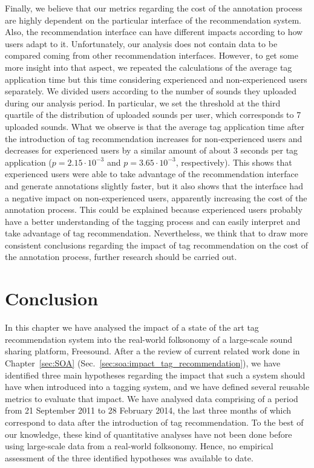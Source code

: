 Finally, we believe that our metrics regarding the cost of the annotation process are highly dependent on the particular interface of the recommendation system. Also, the recommendation interface can have different impacts according to how users adapt to it.
Unfortunately, our analysis does not contain data to be compared coming from other recommendation interfaces. 
However, to get some more insight into that aspect, we repeated the calculations of the average tag application time but this time considering experienced and non-experienced users separately. We divided users according to the number of sounds they uploaded during our analysis period. In particular, we set the threshold at the third quartile of the distribution of uploaded sounds per user, which corresponds to 7 uploaded sounds. What we observe is that the average tag application time after the introduction of tag recommendation increases for non-experienced users and decreases for experienced users by a similar amount of about 3 seconds per tag application ($p = 2.15\cdot 10^{-3}$ and $p = 3.65\cdot 10^{-3}$, respectively). 
This shows that experienced users were able to take advantage of the recommendation interface and generate annotations slightly faster, but it also shows that the interface had a negative impact on non-experienced users, apparently increasing the cost of the annotation process.
This could be explained because experienced users probably have a better understanding of the tagging process and can easily interpret and take advantage of tag recommendation.
Nevertheless, we think that to draw more consistent conclusions regarding the impact of tag recommendation on the cost of the annotation process, further research should be carried out.



\section{Conclusion}
\label{impact:sec:conclusion}

In this chapter we have analysed the impact of a state of the art tag recommendation system into the real-world folksonomy of a large-scale sound sharing platform, Freesound. After a the review of current related work done in Chapter~\ref{sec:SOA} (Sec.~\ref{sec:soa:impact_tag_recommendation}), we have identified three main hypotheses regarding the impact that such a system should have when introduced into a tagging system, and we have defined several reusable metrics to evaluate that impact. We have analysed data comprising of a period from 21 September 2011 to 28 February 2014, the last three months of which correspond to data after the introduction of tag recommendation. To the best of our knowledge, these kind of quantitative analyses have not been done before using large-scale data from a real-world folksonomy. Hence, no empirical assessment of the three identified hypotheses was available to date. %

